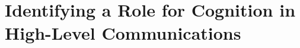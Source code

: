 \documentclass[conference]{IEEEtran}
\begin{document}
%
%
%


\section{Identifying a Role for Cognition in High-Level Communications} \label{sec:hlc}

\end{document}

